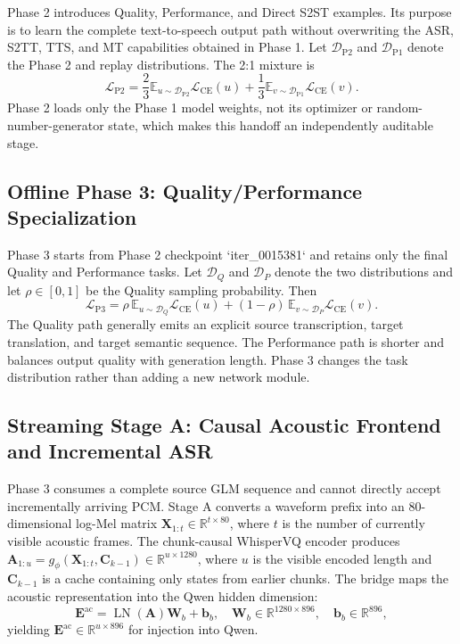 \documentclass[11pt,a4paper]{article}
\newcommand{\vect}[1]{\bm{#1}}
\newcommand{\mat}[1]{\bm{#1}}
\newcommand{\R}{\mathbb{R}}
\newcommand{\Loss}{\mathcal{L}}
\newcommand{\E}{\mathbb{E}}
\begin{document}
Phase 2 introduces Quality, Performance, and Direct S2ST examples. Its purpose is to learn the complete text-to-speech output path without overwriting the ASR, S2TT, TTS, and MT capabilities obtained in Phase 1. Let $\mathcal{D}_{\mathrm{P2}}$ and $\mathcal{D}_{\mathrm{P1}}$ denote the Phase 2 and replay distributions. The 2:1 mixture is
\begin{equation}
 \Loss_{\mathrm{P2}}
 =\frac{2}{3}\E_{u\sim\mathcal{D}_{\mathrm{P2}}}\Loss_{\mathrm{CE}}(u)
 +\frac{1}{3}\E_{v\sim\mathcal{D}_{\mathrm{P1}}}\Loss_{\mathrm{CE}}(v).
 \label{eq:p2}
\end{equation}
Phase 2 loads only the Phase 1 model weights, not its optimizer or random-number-generator state, which makes this handoff an independently auditable stage.

\subsection{Offline Phase 3: Quality/Performance Specialization}

Phase 3 starts from Phase 2 checkpoint `iter\_0015381` and retains only the final Quality and Performance tasks. Let $\mathcal{D}_Q$ and $\mathcal{D}_P$ denote the two distributions and let $\rho\in[0,1]$ be the Quality sampling probability. Then
\begin{equation}
 \Loss_{\mathrm{P3}}
 =\rho\,\E_{u\sim\mathcal{D}_{Q}}\Loss_{\mathrm{CE}}(u)
 +(1-\rho)\,\E_{v\sim\mathcal{D}_{P}}\Loss_{\mathrm{CE}}(v).
 \label{eq:p3}
\end{equation}
The Quality path generally emits an explicit source transcription, target translation, and target semantic sequence. The Performance path is shorter and balances output quality with generation length. Phase 3 changes the task distribution rather than adding a new network module.

\subsection{Streaming Stage A: Causal Acoustic Frontend and Incremental ASR}

Phase 3 consumes a complete source GLM sequence and cannot directly accept incrementally arriving PCM. Stage A converts a waveform prefix into an 80-dimensional log-Mel matrix $\mat{X}_{1:t}\in\R^{t\times80}$, where $t$ is the number of currently visible acoustic frames. The chunk-causal WhisperVQ encoder produces $\mat{A}_{1:u}=g_\phi(\mat{X}_{1:t},\mat{C}_{k-1})\in\R^{u\times1280}$, where $u$ is the visible encoded length and $\mat{C}_{k-1}$ is a cache containing only states from earlier chunks. The bridge maps the acoustic representation into the Qwen hidden dimension:
\begin{equation}
 \mat{E}^{\mathrm{ac}}=\operatorname{LN}(\mat{A})\mat{W}_{b}+\vect{b}_{b},
 \quad \mat{W}_{b}\in\R^{1280\times896},
 \quad \vect{b}_{b}\in\R^{896},
 \label{eq:bridge}
\end{equation}
yielding $\mat{E}^{\mathrm{ac}}\in\R^{u\times896}$ for injection into Qwen.
\end{document}
